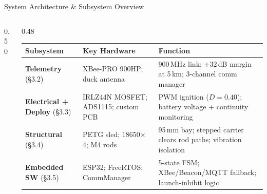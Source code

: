 \documentclass[aspectratio=169, 11pt]{beamer}
\begin{document}
\begin{frame}[shrink=5]{System Architecture \& Subsystem Overview}
\begin{columns}[T]
\begin{column}{0.50\textwidth}
  \end{column}

  \begin{column}{0.48\textwidth}
  \small
  \renewcommand{\arraystretch}{1.30}
  \begin{tabular}{@{}p{1.85cm}p{1.95cm}p{1.95cm}@{}}
    \toprule
    \textbf{Subsystem} & \textbf{Key Hardware} & \textbf{Function}\\
    \midrule
    \textbf{Telemetry} {\scriptsize(\S3.2)}
      & XBee-PRO 900HP; duck antenna
      & 900\,MHz link; $+$32\,dB margin at 5\,km; 3-channel comm manager\\
    \textbf{Electrical + Deploy} {\scriptsize(\S3.3)}
      & IRLZ44N MOSFET; ADS1115; custom PCB
      & PWM ignition ($D{=}0.40$); battery voltage + continuity monitoring\\
    \textbf{Structural} {\scriptsize(\S3.4)}
      & PETG sled; 18650$\times$4; M4 rods
      & 95\,mm bay; stepped carrier clears rod paths; vibration isolation\\
    \textbf{Embedded SW} {\scriptsize(\S3.5)}
      & ESP32; FreeRTOS; Comm\-Manager
      & 5-state FSM; XBee/Beacon/MQTT fallback; launch-inhibit logic\\
    \bottomrule
  \end{tabular}
  \end{column}

\end{columns}
\end{frame}
\end{document}
